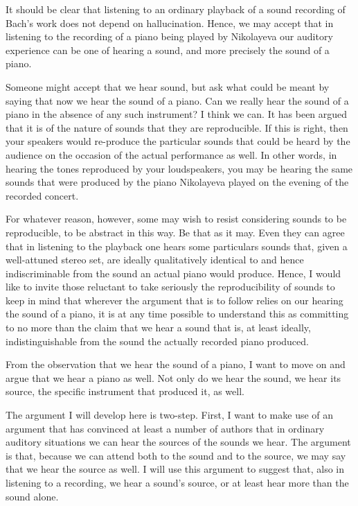 \documentclass[sloppy, journal, git, bytitle, dodraft]{humapap}
\begin{document}
It should be clear that listening to an ordinary playback of a sound recording of Bach's work does not depend on hallucination. Hence, we may accept that in listening to the recording of a piano being played by Nikolayeva our auditory experience can be one of hearing a sound, and more precisely the sound of a piano.

Someone might accept that we hear sound, but ask what could be meant by saying that now we hear the sound of a piano. Can we really hear the sound of a piano in the absence of any such instrument? I think we can. It has been argued that it is of the nature of sounds that they are reproducible. If this is right, then your speakers would re-produce the particular sounds that could be heard by the audience on the occasion of the actual performance as well. In other words, in hearing the tones reproduced by your loudspeakers, you may be hearing the same sounds that were produced by the piano Nikolayeva played on the evening of the recorded concert. 

For whatever reason, however, some may wish to resist considering sounds to be reproducible, to be abstract in this way. Be that as it may. Even they can agree that in listening to the playback one hears some particulars sounds that, given a well-attuned stereo set, are ideally qualitatively identical to and hence indiscriminable from the sound an actual piano would produce. Hence, I would like to invite those reluctant to take seriously the reproducibility of sounds to keep in mind that wherever the argument that is to follow relies on our hearing the sound of a piano, it is at any time possible to understand this as committing to no more than the claim that we hear a sound that is, at least ideally, indistinguishable from the sound the actually recorded piano produced. 


\sect From the observation that we hear the sound of a piano, I want to move on and argue that we hear a piano as well. Not only do we hear the sound, we hear its source, the specific instrument that produced it, as well. 

The argument I will develop here is two-step. First, I want to make use of an argument that has convinced at least a number of authors that in ordinary auditory situations we can hear the sources of the sounds we hear. The argument is that, because we can attend both to the sound and to the source, we may say that we hear the source as well. I will use this argument to suggest that, also in listening to a recording, we hear a sound's source, or at least hear more than the sound alone. 
	
\end{document}
